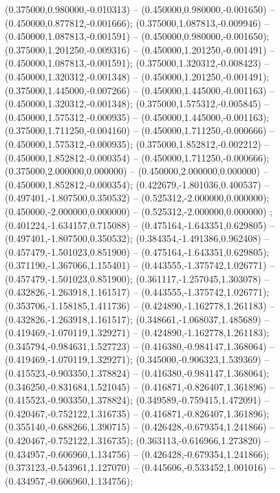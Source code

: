  (0.375000,0.980000,-0.010313) -- (0.450000,0.980000,-0.001650) -- (0.450000,0.877812,-0.001666);
 (0.375000,1.087813,-0.009946) -- (0.450000,1.087813,-0.001591) -- (0.450000,0.980000,-0.001650);
 (0.375000,1.201250,-0.009316) -- (0.450000,1.201250,-0.001491) -- (0.450000,1.087813,-0.001591);
 (0.375000,1.320312,-0.008423) -- (0.450000,1.320312,-0.001348) -- (0.450000,1.201250,-0.001491);
 (0.375000,1.445000,-0.007266) -- (0.450000,1.445000,-0.001163) -- (0.450000,1.320312,-0.001348);
 (0.375000,1.575312,-0.005845) -- (0.450000,1.575312,-0.000935) -- (0.450000,1.445000,-0.001163);
 (0.375000,1.711250,-0.004160) -- (0.450000,1.711250,-0.000666) -- (0.450000,1.575312,-0.000935);
 (0.375000,1.852812,-0.002212) -- (0.450000,1.852812,-0.000354) -- (0.450000,1.711250,-0.000666);
 (0.375000,2.000000,0.000000) -- (0.450000,2.000000,0.000000) -- (0.450000,1.852812,-0.000354);
 (0.422679,-1.801036,0.400537) -- (0.497401,-1.807500,0.350532) -- (0.525312,-2.000000,0.000000);
 (0.450000,-2.000000,0.000000) -- (0.525312,-2.000000,0.000000) ;
 (0.401224,-1.634157,0.715088) -- (0.475164,-1.643351,0.629805) -- (0.497401,-1.807500,0.350532);
 (0.384354,-1.491386,0.962408) -- (0.457479,-1.501023,0.851900) -- (0.475164,-1.643351,0.629805);
 (0.371190,-1.367066,1.155401) -- (0.443555,-1.375742,1.026771) -- (0.457479,-1.501023,0.851900);
 (0.361117,-1.257045,1.303078) -- (0.432826,-1.263918,1.161517) -- (0.443555,-1.375742,1.026771);
 (0.353706,-1.158185,1.411736) -- (0.424890,-1.162778,1.261183) -- (0.432826,-1.263918,1.161517);
 (0.348661,-1.068037,1.485689) -- (0.419469,-1.070119,1.329271) -- (0.424890,-1.162778,1.261183);
 (0.345794,-0.984631,1.527723) -- (0.416380,-0.984147,1.368064) -- (0.419469,-1.070119,1.329271);
 (0.345000,-0.906323,1.539369) -- (0.415523,-0.903350,1.378824) -- (0.416380,-0.984147,1.368064);
 (0.346250,-0.831684,1.521045) -- (0.416871,-0.826407,1.361896) -- (0.415523,-0.903350,1.378824);
 (0.349589,-0.759415,1.472091) -- (0.420467,-0.752122,1.316735) -- (0.416871,-0.826407,1.361896);
 (0.355140,-0.688266,1.390715) -- (0.426428,-0.679354,1.241866) -- (0.420467,-0.752122,1.316735);
 (0.363113,-0.616966,1.273820) -- (0.434957,-0.606960,1.134756) -- (0.426428,-0.679354,1.241866);
 (0.373123,-0.543961,1.127070) -- (0.445606,-0.533452,1.001016) -- (0.434957,-0.606960,1.134756);

